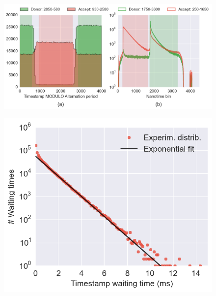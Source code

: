 

\author{Antonino Ingargiola}
\title{}


\verbatimfont{\small}

\maketitle

\begin{abstract}

\end{abstract}

\tableofcontents








\begin{figure}
\begin{center}
\includegraphics[width=0.6\columnwidth]{"figures/ALEX_alternation_double/ALEX_alternation_double"}
\caption[]{}
\end{center}
\end{figure}





\begin{figure}
\begin{center}
\includegraphics[width=0.6\columnwidth]{"figures/ph_delays_distrib1/ph_delays_distrib1"}
\caption[]{}
\end{center}
\end{figure}

